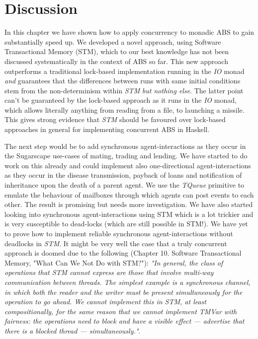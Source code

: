 \section{Discussion}
In this chapter we have shown how to apply concurrency to monadic ABS to gain substantially speed up. We developed a novel approach, using Software Transactional Memory (STM), which to our best knowledge has not been discussed systematically in the context of ABS so far. This new approach outperforms a traditional lock-based implementation running in the \textit{IO} monad \textit{and} guarantees that the differences between runs with same initial conditions stem from the non-determinism within \textit{STM} \textit{but nothing else}. The latter point can't be guaranteed by the lock-based approach as it runs in the \textit{IO} monad, which allows literally anything from reading from a file, to launching a missile. This gives strong evidence that \textit{STM} should be favoured over lock-based approaches in general for implementing concurrent ABS in Haskell.

The next step would be to add synchronous agent-interactions as they occur in the Sugarscape use-cases of mating, trading and lending. We have started to do work on this already and could implement also one-directional agent-interactions as they occur in the disease transmission, payback of loans and notification of inheritance upon the death of a parent agent. We use the \textit{TQueue} primitive to emulate the behaviour of mailboxes through which agents can post events to each other. The result is promising but needs more investigation. We have also started looking into synchronous agent-interactions using STM which is a lot trickier and is very susceptible to dead-locks (which are still possible in STM!). We have yet to prove how to implement reliable synchronous agent-interactions without deadlocks in \textit{STM}. It might be very well the case that a truly concurrent approach is doomed due to the following \cite{marlow_parallel_2013} (Chapter 10. Software Transactional Memory, "What Can We Not Do with STM?"): \textit{"In general, the class of operations that STM cannot express are those that involve multi-way communication between threads. The simplest example is a synchronous channel, in which both the reader and the writer must be present simultaneously for the operation to go ahead. We cannot implement this in STM, at least compositionally, for the same reason that we cannot implement TMVar with fairness: the operations need to block and have a visible effect — advertise that there is a blocked thread — simultaneously."}. 

